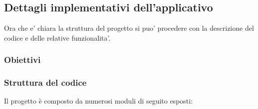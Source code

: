\subsection{Dettagli implementativi dell'applicativo}
Ora che e' chiara la struttura del progetto si puo' procedere con la descrizione del
codice e delle relative funzionalita'.
\subsubsection{Obiettivi}

\subsubsection{Struttura del codice}
Il progetto è composto da numerosi moduli di seguito esposti:
